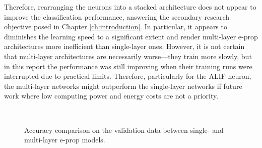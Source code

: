 		Therefore, rearranging the neurons into a stacked architecture does not appear to improve the classification performance, answering the secondary research objective posed in Chapter \ref{ch:introduction}.
		In particular, it appears to diminishes the learning speed to a significant extent and render multi-layer e-prop architectures more inefficient than single-layer ones.
		However, it is not certain that multi-layer architectures are necessarily worse---they train more slowly, but in this report the performance was still improving when their training runs were interrupted due to practical limits.
		Therefore, particularly for the ALIF neuron, the multi-layer networks might outperform the single-layer networks if future work where low computing power and energy costs are not a priority.

		\begin{figure}[bth]
		    \myfloatalign
		     \quad
		     \\
		    \caption[Single- and multi-layer accuracy comparison]{Accuracy comparison on the validation data between single- and multi-layer e-prop models.}\label{fig:ml-percwrong}
		\end{figure}


